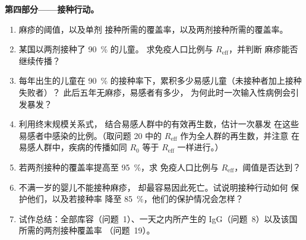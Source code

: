 \begin{problem}
\medskip
\noindent\textbf{第四部分——接种行动。}
\begin{enumerate}[resume]
  \item 麻疹的阈值，以及单剂
        接种所需的覆盖率，以及两剂接种所需的覆盖率。
  \item 某国以两剂接种了 \qty{90}{\%} 的儿童。
        求免疫人口比例与 $R_{\text{eff}}$，并判断
        麻疹能否继续传播？
  \item 每年出生的儿童在
        \qty{90}{\%} 的接种率下，累积多少易感儿童（未接种者加上接种失败者）？
        此后五年无麻疹，易感者有多少，
        为何此时一次输入性病例会引发暴发？
  \item 利用终末规模关系式，
        结合易感人群中的有效再生数，估计一次暴发
        在这些易感者中感染的比例。（取问题 20 中的
        $R_{\text{eff}}$ 作为全人群的再生数，并注意
        在易感人群中，疾病的传播如同 $R_{0}$ 等于
        $R_{\text{eff}}$ 一样进行。）
  \item 若两剂接种的覆盖率提高至 \qty{95}{\%}，求
        免疫人口比例与 $R_{\text{eff}}$，阈值是否达到？
  \item 不满一岁的婴儿不能接种麻疹，
        却最容易因此死亡。试说明接种行动如何
        保护他们，以及若接种率
        降至 \qty{85}{\%}，他们的保护情况会怎样？
  \item 试作总结：全部库容（问题~1）、一天之内所产生的
        IgG（问题~8）以及该国所需的两剂接种覆盖率
        （问题~19）。
\end{enumerate}
\end{problem}
